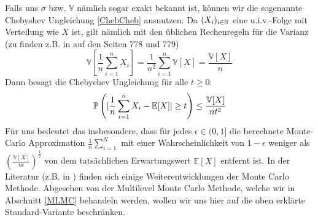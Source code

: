  	Falls uns $ \sigma $ bzw. $ \mathbb{V} $ nämlich sogar exakt bekannt ist, können wir die sogenannte Chebyshev Ungleichung \ref{ChebCheb} ausnutzen:
 	Da $ (X_i)_{i \in \mathbb{N}} $ eine u.i.v.-Folge mit Verteilung wie $ X $ ist, gilt nämlich mit den üblichen Rechenregeln für die Varianz (zu finden z.B. in \cite{brokate2016grundwissen} auf den Seiten 778 und 779)
 	\[
 		\mathbb{V}[\frac{1}{n}\sum_{i=1}^{n}X_i] =  \frac{1}{n^2} \sum_{i=1}^{n} \mathbb{V}[X] = \frac{\mathbb{V}[X]}{n}
 	\]
 	Dann besagt die Chebychev Ungleichung für alle $ t \geq 0 $:
 	\[
 		\mathbb{P}\left(| \frac{1}{n}\sum_{i=1}^{n}X_i-\mathbb{E}[X] | \geq t \right) \leq \frac{\mathbb{V}[X]}{nt^2}
 	\]
 	Für uns bedeutet das insbesondere, dass für jedes $ \epsilon \in (0,1] $  die berechnete Monte-Carlo Approximation $ \frac{1}{n}\sum_{i=1}^{N} $ mit einer Wahrscheinlichkeit von $ 1-\epsilon $ weniger als $ \left( \frac{\mathbb{V}[X]}{n\epsilon}\right)^{\frac{1}{2}} $ von dem tatsächlichen Erwartungswert $ \mathbb{E}[X] $ entfernt ist.
 	In der Literatur (z.B. in \cite{sullivan2015introduction}) finden sich einige Weiterentwicklungen der Monte Carlo Methode. Abgesehen von der Multilevel Monte Carlo Methode, welche wir in Abschnitt \ref{MLMC} behandeln werden, wollen wir uns hier auf die oben erklärte Standard-Variante beschränken.
 	
 
 	
	
	
	


